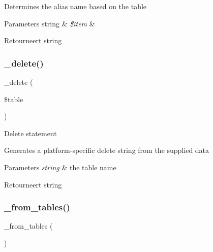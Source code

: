 Determines the alias name based on the table


\begin{DoxyParams}[1]{Parameters}
string & {\em \$item} & \\
\hline
\end{DoxyParams}
\begin{DoxyReturn}{Retourneert}
string 
\end{DoxyReturn}
\mbox{\label{class_c_i___d_b__query__builder_a133ea8446ded52589bd22cc9163d0896}} 
\subsubsection{\texorpdfstring{\_delete()}{\_delete()}}
{\footnotesize\ttfamily \+\_\+delete (\begin{DoxyParamCaption}\item[{}]{\$table }\end{DoxyParamCaption})\hspace{0.3cm}{\ttfamily [protected]}}

Delete statement

Generates a platform-\/specific delete string from the supplied data


\begin{DoxyParams}{Parameters}
{\em string} & the table name \\
\hline
\end{DoxyParams}
\begin{DoxyReturn}{Retourneert}
string 
\end{DoxyReturn}
\mbox{\label{class_c_i___d_b__query__builder_aef43f7e3e7b71d337ff3724c5eb14f10}} 
\subsubsection{\texorpdfstring{\_from\_tables()}{\_from\_tables()}}
{\footnotesize\ttfamily \+\_\+from\+\_\+tables (\begin{DoxyParamCaption}{ }\end{DoxyParamCaption})\hspace{0.3cm}{\ttfamily [protected]}}

